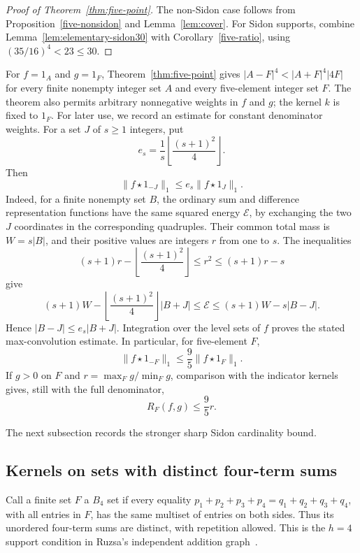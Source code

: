 \begin{proof}[Proof of Theorem~\ref{thm:five-point}]
The non-Sidon case follows from Proposition~\ref{five-nonsidon} and
Lemma~\ref{lem:cover}. For Sidon supports, combine
Lemma~\ref{lem:elementary-sidon30} with Corollary~\ref{five-ratio}, using
$(35/16)^4<23\le30$.
\end{proof}

For $f=1_A$ and $g=1_F$, Theorem~\ref{thm:five-point} gives
$|A-F|^4<|A+F|^4|4F|$ for every finite nonempty integer set $A$ and every
five-element integer set $F$. The theorem also permits arbitrary
nonnegative weights in $f$ and $g$; the kernel $k$ is fixed to $1_F$.
For later use, we record an estimate for constant denominator weights.
For a set $J$ of $s\ge1$ integers, put
\[
 e_s=\frac1s\left\lfloor\frac{(s+1)^2}{4}\right\rfloor.
\]
Then
\[
 \|f\star1_{-J}\|_1\le e_s\|f\star1_J\|_1.
\]
Indeed, for a finite nonempty set $B$, the ordinary sum and difference
representation functions have the same squared energy $\mathcal E$,
by exchanging the two $J$ coordinates in the corresponding quadruples.
Their common total mass is $W=s|B|$, and their positive values are
integers $r$ from one to $s$. The inequalities
\[
 (s+1)r-\left\lfloor\frac{(s+1)^2}{4}\right\rfloor
 \le r^2\le(s+1)r-s
\]
give
\[
 (s+1)W-\left\lfloor\frac{(s+1)^2}{4}\right\rfloor|B+J|
 \le\mathcal E\le(s+1)W-s|B-J|.
\]
Hence $|B-J|\le e_s|B+J|$. Integration over the level sets of $f$
proves the stated max-convolution estimate. In particular, for
five-element $F$,
\begin{equation}\label{five-energy}
 \|f\star1_{-F}\|_1\le\frac95\|f\star1_F\|_1.
\end{equation}
If $g>0$ on $F$ and $r=\max_Fg/\min_Fg$, comparison with the
indicator kernels gives, still with the full denominator,
\begin{equation}\label{five-range-energy}
 R_F(f,g)\le\frac95r.
\end{equation}

The next subsection records the stronger sharp Sidon cardinality bound.



\subsection{Kernels on sets with distinct four-term sums}

Call a finite set $F$ a $B_4$ set if every equality
$p_1+p_2+p_3+p_4=q_1+q_2+q_3+q_4$, with all entries in $F$, has the
same multiset of entries on both sides. Thus its unordered four-term sums
are distinct, with repetition allowed. This is the $h=4$ support condition
in Ruzsa's independent addition graph~\cite[Chapter~1, Section~5,
pp.~11--12]{ruzsa-structure}.

